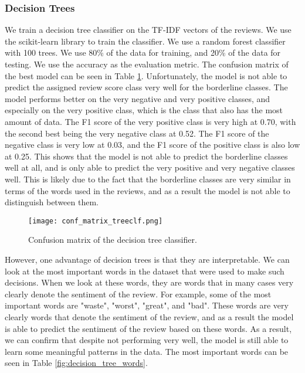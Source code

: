 \documentclass[12pt]{article}    %
\begin{document}
\subsubsection{Decision Trees}

We train a decision tree classifier on the TF-IDF vectors of the reviews. We use the scikit-learn library \cite{scikit-learn} to train the classifier. We use a random forest classifier with 100 trees. We use 80\% of the data for training, and 20\% of the data for testing. We use the accuracy as the evaluation metric. The confusion matrix of the best model can be seen in Table \ref{fig:decision_tree_conf}. Unfortunately, the model is not able to predict the assigned review score class very well for the borderline classes. The model performs better on the very negative and very positive classes, and especially on the very positive class, which is the class that also has the most amount of data. The F1 score of the very positive class is very high at 0.70, with the second best being the very negative class at 0.52. The F1 score of the negative class is very low at 0.03, and the F1 score of the positive class is also low at 0.25. This shows that the model is not able to predict the borderline classes well at all, and is only able to predict the very positive and very negative classes well. This is likely due to the fact that the borderline classes are very similar in terms of the words used in the reviews, and as a result the model is not able to distinguish between them.

\begin{figure}
    \centering
    \texttt{[image: conf\_matrix\_treeclf.png]}
    \caption{Confusion matrix of the decision tree classifier.}
    \label{fig:decision_tree_conf}
\end{figure}



However, one advantage of decision trees is that they are interpretable. We can look at the most important words in the dataset that were used to make such decisions. When we look at these words, they are words that in many cases very clearly denote the sentiment of the review. For example, some of the most important words are "waste", "worst", "great", and "bad". These words are very clearly words that denote the sentiment of the review, and as a result the model is able to predict the sentiment of the review based on these words. As a result, we can confirm that despite not performing very well, the model is still able to learn some meaningful patterns in the data. The most important words can be seen in Table \ref{fig:decision_tree_words}.
\end{document}
